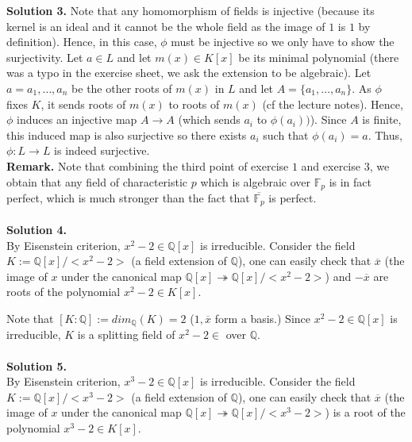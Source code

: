 \documentclass[12pt,a4paper]{article}
\begin{document}
\textbf{Solution 3.} Note that any homomorphism of fields is injective (because its kernel is an ideal and it cannot be the whole field as the image of $1$ is $1$ by definition). Hence, in this case, $\phi$ must be injective so we only have to show the surjectivity. Let $a \in L$ and let $m(x) \in K[x]$ be its minimal polynomial (there was a typo in the exercise sheet, we ask the extension to be algebraic). Let $a = a_1, \dots, a_n$ be the other roots of $m(x)$ in $L$ and let $A = \{a_1, \dots, a_n\}$. As $\phi$ fixes $K$, it sends roots of $m(x)$ to roots of $m(x)$ (cf the lecture notes). Hence, $\phi$ induces an injective map $A \rightarrow A$ (which sends $a_i$ to $\phi(a_i))$). Since $A$ is finite, this induced map is also surjective so there exists $a_i$ such that $\phi(a_i) = a$. Thus, $\phi : L \rightarrow L$ is indeed surjective. \\

\textbf{Remark.} Note that combining the third point of exercise $1$ and exercise $3$, we obtain that any field of characteristic $p$ which is algebraic over $\mathbb{F}_p$ is in fact perfect, which is much stronger than the fact that $\overline{\mathbb{F}_p}$ is perfect. \\
\\
\textbf{Solution 4.}\\

By Eisenstein criterion, $x^2-2\in \mathbb{Q}[x]$ is irreducible. Consider the field $K:=\mathbb{Q}[x]/<x^2-2>$ (a field extension of $\mathbb{Q}$), one can easily check that $\overline{x}$ (the image of $x$ under the canonical map $\mathbb{Q}[x]\twoheadrightarrow\mathbb{Q}[x]/<x^2-2>$) and $-\overline{x}$ are roots of the polynomial $x^2-2\in K[x]$.

Note that $[K:\mathbb{Q}]:=dim_{\mathbb{Q}}(K)=2$ ($1,\overline{x}$ form a basis.) Since $x^2-2\in \mathbb{Q}[x]$ is irreducible, $K$ is a splitting field of $x^2-2\in $ over $\mathbb{Q}$.\\
\\
\textbf{Solution 5.}\\

By Eisenstein criterion, $x^3-2\in \mathbb{Q}[x]$ is irreducible. Consider the field $K:=\mathbb{Q}[x]/<x^3-2>$ (a field extension of $\mathbb{Q}$), one can easily check that $\overline{x}$ (the image of $x$ under the canonical map $\mathbb{Q}[x]\twoheadrightarrow\mathbb{Q}[x]/<x^3-2>$) is a root of the polynomial $x^3-2\in K[x]$. 
\end{document}
